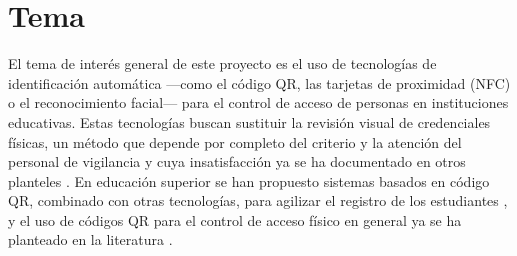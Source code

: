 \section{Tema}
El tema de interés general de este proyecto es el uso de tecnologías de
identificación automática —como el código QR, las tarjetas de proximidad
(NFC) o el reconocimiento facial— para el control de acceso de personas en
instituciones educativas. Estas tecnologías buscan sustituir la revisión
visual de credenciales físicas, un método que depende por completo del
criterio y la atención del personal de vigilancia y cuya insatisfacción ya se
ha documentado en otros planteles \parencite{torres2019qr}. En educación
superior se han propuesto sistemas basados en código QR, combinado con otras
tecnologías, para agilizar el registro de los estudiantes
\parencite{cano2026sistema}, y el uso de códigos QR para el control de acceso
físico en general ya se ha planteado en la literatura
\parencite{kao2011physical}.
